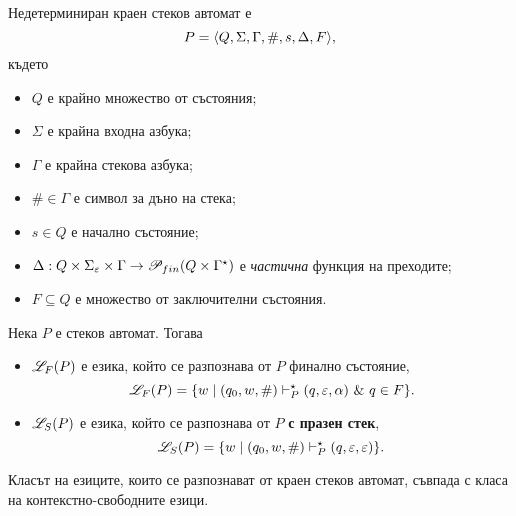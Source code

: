 \begin{dfn}
  Недетерминиран краен стеков автомат е \[P = \langle{Q,\Sigma,\Gamma,\#,s,\Delta,F}\rangle,\] където 
  \begin{itemize}
  \item
    $Q$ е крайно множество от състояния;
  \item  
    $\Sigma$ е крайна входна азбука;
  \item
    $\Gamma$ е крайна стекова азбука;
  \item
    $\# \in \Gamma$ е символ за дъно на стека;
  \item
    $s\in Q$ е начално състояние;
  \item
    $\Delta:Q\times\Sigma_\varepsilon\times\Gamma\rightarrow \mathscr{P}_{fin}(Q\times\Gamma^\star)$ 
    е {\em частична} функция на преходите;    
  \item
    $F\subseteq Q$ е множество от заключителни състояния.
  \end{itemize}
\end{dfn}

Нека $P$ е стеков автомат. Тогава
\begin{itemize}
\item
  $\mathscr{L}_F(P)$ е езика, който се разпознава от $P$ { финално състояние},
  \[\mathscr{L}_F(P) = \{w\mid (q_0,w,\#) \vdash^\star_P (q,\varepsilon,\alpha)\ \&\ q \in F\}.\]    
\item
  $\mathscr{L}_S(P)$ е езика, който се разпознава от $P$  {\bf с празен стек},
  \[\mathscr{L}_S(P) = \{w\mid (q_0,w,\#) \vdash^\star_P (q,\varepsilon,\varepsilon)\}.\]    
\end{itemize}

\begin{thm}
  Класът на езиците, които се разпознават от краен стеков автомат, съвпада с
  класа на контекстно-свободните езици.
\end{thm}

